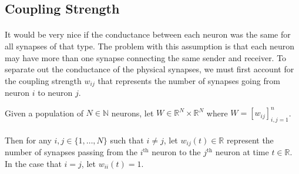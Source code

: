 \documentclass{article}
\begin{document}
\subsection{Coupling Strength}

\paragraph{}
It would be very nice if the conductance between each neuron was the same for all synapses of that type. The problem with this assumption is that each neuron may have more than one synapse connecting the same sender and receiver. To separate out the conductance of the physical synapses, we must first account for the coupling strength $w_{ij}$ that represents the number of synapses going from neuron $i$ to neuron $j$.

\begin{definition}[$W(t) = \textbf{coupling strength matrix}$]\label{W}
Given a population of $N\in\mathbb{N}$ neurons, let $W \in \mathbb{R}^{N} \times \mathbb{R}^{N}$ where $W = [w_{ij}]_{i,j=1}^{n}$. \\
\\
Then for any $i,j \in \{ 1, \dots, N \}$ such that $i \ne j$, let $w_{ij}(t) \in \mathbb{R}$ represent the number of synapses passing from the $i^{\text{th}}$ neuron to the $j^{\text{th}}$ neuron at time $t\in\mathbb{R}$. In the case that $i=j$, let $w_{ii}(t)=1$.
\end{definition}
\end{document}
